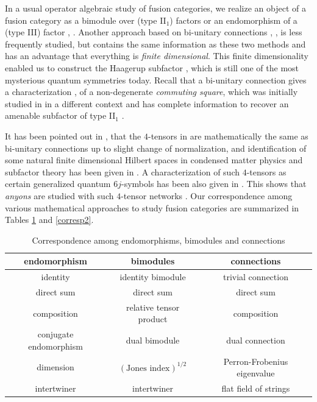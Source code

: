 \documentclass[12pt]{article}
\begin{document}
In a usual operator algebraic study of fusion categories,
we realize an object of a fusion
category as a bimodule over (type II$_1$)
factors or an endomorphism of a (type III) factor
\cite{EK1}, \cite{EK2}.  Another approach \cite{AH} based on 
bi-unitary connections \cite{O}, \cite{Sc}, \cite{K1} is less
frequently studied, but contains the same information as these
two methods and has an advantage that everything is
\textit{finite dimensional}.  This finite dimensionality
enabled us to construct the Haagerup subfactor \cite{AH},
which is still one of the most mysterious quantum
symmetries today.  Recall that a bi-unitary
connection gives a characterization \cite{Sc},
\cite{EK1} of a non-degenerate \textit{commuting square}, which
was initially studied in \cite{P1} in a different context
and has complete information to recover an amenable 
subfactor of type II$_1$ \cite{P2}.

It has been pointed out
in \cite{K2}, \cite{K4} that the $4$-tensors in 
\cite{BMWSHV} are mathematically the same as
bi-unitary connections up to slight change of
normalization, and identification of
some natural finite dimensional Hilbert spaces in condensed matter 
physics and subfactor theory has been given in \cite{K3}.
A characterization of such $4$-tensors as certain
generalized quantum $6j$-symbols has been also given
in \cite{K5}.  
This shows that \textit{anyons} \cite{Ko}
are studied with such $4$-tensor networks \cite{H}.
Our correspondence among various mathematical
approaches to study fusion categories are
summarized in Tables \ref{corresp} and \ref{corresp2}.

\begin{table}[H]
\centering
\caption{Correspondence among endomorphisms, 
bimodules and connections
\label{corresp}}
\begin{tabular}{|c|c|c|}
\hline
endomorphism & bimodules & connections \\ \hline \hline
identity & identity bimodule & trivial connection \\ \hline
direct sum & direct sum & direct sum \\ \hline
composition &  relative tensor product & composition \\ \hline
conjugate endomorphism & dual bimodule & dual connection \\ \hline
dimension & $(\text{Jones\ index})^{1/2}$ &
Perron-Frobenius eigenvalue \\ \hline
intertwiner & intertwiner & flat field of strings \\ \hline
\end{tabular}
\end{table}
\end{document}
